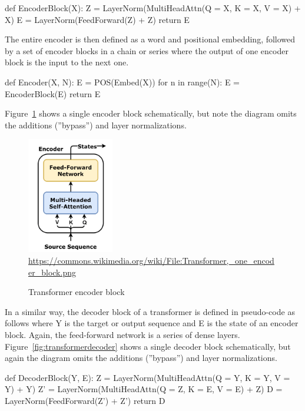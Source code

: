 \begin{textcode}
def EncoderBlock(X):
  Z = LayerNorm(MultiHeadAttn(Q = X, K = X, V = X) + X)
  E = LayerNorm(FeedForward(Z) + Z)
  return E
\end{textcode}

The entire encoder is then defined as a word and positional embedding, followed by a set of encoder blocks in a chain or series where the output of one encoder block is the input to the next one. 

\begin{textcode}
def Encoder(X, N):
  E = POS(Embed(X))
  for n in range(N):
    E = EncoderBlock(E)
  return E
\end{textcode}

Figure~\ref{fig:transformerencoder} shows a single encoder block schematically, but note the diagram omits the additions (''bypass'') and layer normalizations. 

\begin{figure}
\centering
\includegraphics[height=2in]{Transformer,_one_encoder_block.png} \\

\scriptsize \url{https://commons.wikimedia.org/wiki/File:Transformer,_one_encoder_block.png}\normalsize
\caption{Transformer encoder block}
\label{fig:transformerencoder}
\end{figure}

In a similar way, the decoder block of a transformer is defined in pseudo-code as follows where Y is the target or output sequence and E is the state of an encoder block. Again, the feed-forward network is a series of dense layers. Figure~\ref{fig:transformerdecoder} shows a single decoder block schematically, but again the diagram omits the additions (''bypass'') and layer normalizations.

\begin{textcode}
def DecoderBlock(Y, E):
  Z = LayerNorm(MultiHeadAttn(Q = Y, K = Y, V = Y) + Y)
  Z' = LayerNorm(MultiHeadAttn(Q = Z, K = E, V = E) + Z)
  D = LayerNorm(FeedForward(Z') + Z')
  return D
\end{textcode}

